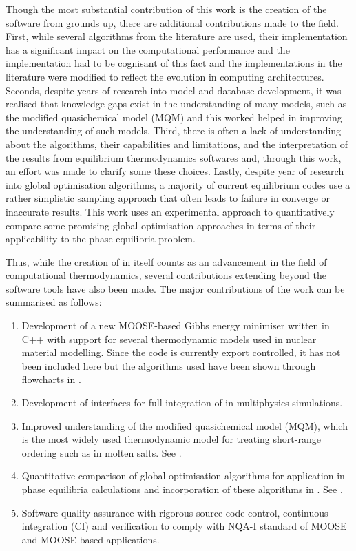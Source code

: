 	Though the most substantial contribution of this work is the creation of the software from grounds up, there are additional contributions made to the field. First, while several algorithms from the literature are used, their implementation has a significant impact on the computational performance and the implementation had to be cognisant of this fact and the implementations in the literature were modified to reflect the evolution in computing architectures. Seconds, despite years of research into model and database development, it was realised that knowledge gaps exist in the understanding of many models, such as the modified quasichemical model (MQM) and this worked helped in improving the understanding of such models. Third, there is often a lack of understanding about the algorithms, their capabilities and limitations, and the interpretation of the results from equilibrium thermodynamics softwares and, through this work, an effort was made to clarify some these choices. Lastly, despite year of research into global optimisation algorithms, a majority of current equilibrium codes use a rather simplistic sampling approach that often leads to failure in converge or inaccurate results. This work uses an experimental approach to quantitatively compare some promising global optimisation approaches in terms of their applicability to the phase equilibria problem. 
	
	Thus, while the creation of {\GEM} in itself counts as an advancement in the field of computational thermodynamics, several contributions extending beyond the software tools have also been made. The major contributions of the work can be summarised as follows:
	\begin{enumerate}
		\item Development of a new MOOSE-based Gibbs energy minimiser written in C++ with support for several thermodynamic models used in nuclear material modelling. Since the code is currently export controlled, it has not been included here but the algorithms used have been shown through flowcharts in .
		\item Development of interfaces for full integration of {\GEM} in multiphysics simulations.
		\item Improved understanding of the modified quasichemical model (MQM), which is the most widely used thermodynamic model for treating short-range ordering such as in molten salts. See .
		\item Quantitative comparison of global optimisation algorithms for application in phase equilibria calculations and incorporation of these algorithms in \GEM. See .
		\item Software quality assurance  with rigorous source code control, continuous integration (CI) and verification to comply with NQA-I standard of MOOSE and MOOSE-based applications.
	\end{enumerate}

